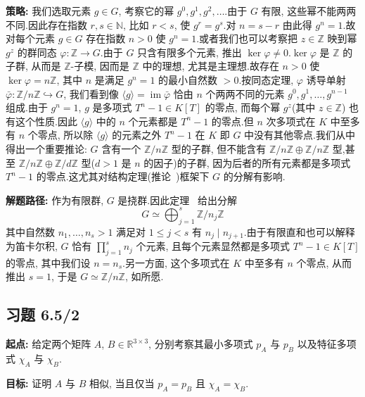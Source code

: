 \noindent\textbf{策略:} 我们选取元素 $g \in G$, 考察它的幂 $g^0, g^1, g^2, \ldots$.由于 $G$ 有限, 这些幂不能两两不同.因此存在指数 $r, s \in \mathbb{N}$, 比如 $r < s$, 使 $g^r = g^s$.对 $n = s - r$ 由此得 $g^n = 1$.故对每个元素 $g \in G$ 存在指数 $n > 0$ 使 $g^n = 1$.或者我们也可以考察把 $z \in \mathbb{Z}$ 映到幂 $g^z$ 的群同态 $\varphi \colon \mathbb{Z} \longrightarrow G$.由于 $G$ 只含有限多个元素, 推出 $\ker \varphi \neq 0$.$\ker \varphi$ 是 $\mathbb{Z}$ 的子群, 从而是 $\mathbb{Z}$-子模, 因而是 $\mathbb{Z}$ 中的理想, 尤其是主理想.故存在 $n > 0$ 使 $\ker \varphi = n \mathbb{Z}$, 其中 $n$ 是满足 $g^n = 1$ 的最小自然数 $> 0$.按同态定理, $\varphi$ 诱导单射 $\bar{\varphi} \colon \mathbb{Z}/n \mathbb{Z} \hookrightarrow G$, 我们看到像 $\langle g \rangle = \operatorname{im} \bar{\varphi}$ 恰由 $n$ 个两两不同的元素 $g^0, g^1, \ldots, g^{n - 1}$ 组成.由于 $g^n = 1$, $g$ 是多项式 $T^n - 1 \in K[T]$ 的零点, 而每个幂 $g^z$(其中 $z \in \mathbb{Z}$) 也有这个性质.因此 $\langle g \rangle$ 中的 $n$ 个元素都是 $T^n - 1$ 的零点.但 $n$ 次多项式在 $K$ 中至多有 $n$ 个零点, 所以除 $\langle g \rangle$ 的元素之外 $T^n - 1$ 在 $K$ 即 $G$ 中没有其他零点.我们从中得出一个重要推论: $G$ 含有一个 $\mathbb{Z}/n \mathbb{Z}$ 型的子群, 但不能含有 $\mathbb{Z}/n \mathbb{Z} \oplus \mathbb{Z}/n \mathbb{Z}$ 型,甚至 $\mathbb{Z}/n \mathbb{Z} \oplus \mathbb{Z}/d \mathbb{Z}$ 型($d > 1$ 是 $n$ 的因子)的子群, 因为后者的所有元素都是多项式 $T^n - 1$ 的零点.这尤其对结构定理(推论~)框架下 $G$ 的分解有影响.

\noindent\textbf{解题路径:} 作为有限群, $G$ 是挠群.因此定理~ 给出分解
\[
G \simeq \bigoplus_{j = 1}^{s} \mathbb{Z}/n_j \mathbb{Z}
\]
其中自然数 $n_1, \ldots, n_s > 1$ 满足对 $1 \leq j < s$ 有 $n_j \mid n_{j + 1}$.由于有限直和也可以解释为笛卡尔积, $G$ 恰有 $\prod_{j = 1}^{s} n_j$ 个元素, 且每个元素显然都是多项式 $T^n - 1 \in K[T]$ 的零点, 其中我们设 $n = n_s$.另一方面, 这个多项式在 $K$ 中至多有 $n$ 个零点, 从而推出 $s = 1$, 于是 $G \simeq \mathbb{Z}/n \mathbb{Z}$, 如所愿.

\subsection*{习题 6.5/2}

\noindent\textbf{起点:} 给定两个矩阵 $A$, $B \in \mathbb{R}^{3 \times 3}$, 分别考察其最小多项式 $p_A$ 与 $p_B$ 以及特征多项式 $\chi_A$ 与 $\chi_B$.

\noindent\textbf{目标:} 证明 $A$ 与 $B$ 相似, 当且仅当 $p_A = p_B$ 且 $\chi_A = \chi_B$.

